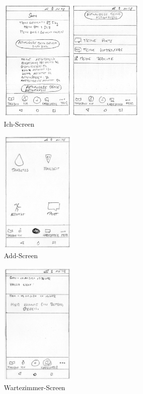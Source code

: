 \begin{figure}[H]
	\centering
	\includegraphics[width=0.66\textwidth]{images/ichscreen.png}
	\captionsetup{justification=centering}
	\caption{Ich-Screen}
	\label{img:ichscreen}
\end{figure}
\begin{figure}[H]
	\centering
	\includegraphics[width=0.33\textwidth]{images/addscreen.png}
	\captionsetup{justification=centering}
	\caption{Add-Screen}
	\label{img:addscreen}
\end{figure}
\begin{figure}[H]
	\centering
	\includegraphics[width=0.33\textwidth]{images/wartezimmerscreen.png}
	\captionsetup{justification=centering}
	\caption{Wartezimmer-Screen}
	\label{img:wartezimmerscreen}
\end{figure}
